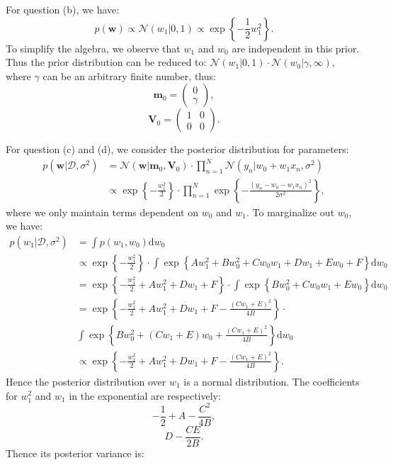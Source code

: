 \documentclass[UTF8]{ctexart}
\begin{document}
For question (b), we have:
$$p(\textbf{w}) \propto \mathcal{N}(w_{1}|0,1) \propto \exp\left\{ -\frac{1}{2}w_{1}^{2} \right\}.$$
To simplify the algebra, we observe that $w_{1}$ and $w_{0}$ are independent in this prior.
Thus the prior distribution can be reduced to:
$\mathcal{N}(w_{1}|0,1)\cdot \mathcal{N}(w_{0}|\gamma,\infty),$
where $\gamma$ can be an arbitrary finite number, thus:
$$\textbf{m}_{0}=\begin{pmatrix}
0 \\
\gamma
\end{pmatrix},$$
$$\textbf{V}_{0}=\begin{pmatrix}
1 & 0 \\
0 & 0
\end{pmatrix}.$$

For question (c) and (d), we consider the posterior distribution for parameters:
$$
\begin{aligned}
p(\textbf{w}|\mathcal{D},\sigma^{2}) &=\mathcal{N}(\textbf{w}|\textbf{m}_{0},\textbf{V}_{0})\cdot\prod_{n=1}^{N}\mathcal{N}(y_{n}|w_{0}+w_{1}x_{n},\sigma^{2})\\
&\propto\exp\left\{-\frac{w^{2}_{1}}{2} \right\}\cdot \prod_{n=1}^{N}\exp\left\{-\frac{(y_{n}-w_{0}-w_{1}x_{n})^{2}}{2\sigma^{2}} \right\},
\end{aligned}
$$
where we only maintain terms dependent on $w_{0}$ and $w_{1}$.
To marginalize out $w_{0}$, we have:
$$
\begin{aligned}
p(w_{1}|\mathcal{D},\sigma^{2})&=\int p(w_{1},w_{0})\text{d}w_{0}\\
&\propto\exp\left\{-\frac{w_{1}^{2}}{2}\right\}\cdot\int \exp\left\{Aw_{1}^{2}+Bw_{0}^{2}+Cw_{0}w_{1}+Dw_{1}+Ew_{0}+F \right\}\text{d}w_{0}\\
&=\exp\left\{-\frac{w_{1}^{2}}{2}+Aw_{1}^{2}+Dw_{1}+F\right\}\cdot \int \exp\left\{Bw_{0}^{2}+Cw_{0}w_{1}+Ew_{0} \right\}\text{d}w_{0}\\
&=\exp\left\{-\frac{w_{1}^{2}}{2}+Aw_{1}^{2}+Dw_{1}+F-\frac{(Cw_{1}+E)^{2}}{4B}\right\}\cdot \\
&\int \exp\left\{Bw_{0}^{2}+(Cw_{1}+E)w_{0}+ \frac{(Cw_{1}+E)^{2}}{4B}\right\}\text{d}w_{0}\\
&\propto \exp\left\{-\frac{w_{1}^{2}}{2}+Aw_{1}^{2}+Dw_{1}+F-\frac{(Cw_{1}+E)^{2}}{4B}\right\}.
\end{aligned}
$$
Hence the posterior distribution over $w_{1}$ is a normal distribution.
The coefficients for $w_{1}^{2}$ and $w_{1}$ in the exponential are respectively:
$$-\frac{1}{2}+A-\frac{C^{2}}{4B},$$
$$D-\frac{CE}{2B}.$$
Thence its posterior variance is:
\end{document}
